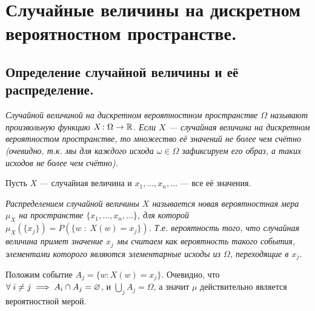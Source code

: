\section{Случайные величины на дискретном вероятностном пространстве.}

\subsection{Определение случайной величины и её распределение.}
\begin{definition}
    \it{Случайной величиной} на дискретном вероятностном пространстве $\Omega$ называют произвольную функцию
    $X \colon \Omega \to \mathbb{R}$. Если $X$ --- случайная величина на дискретном вероятностом пространстве, то
    множество её значений не более чем счётно (очевидно, т.к. мы для каждого исхода $\omega \in \Omega$
    зафиксируем его образ, а таких исходов не более чем счётно).
\end{definition}
Пусть $X$ --- случайная величина и $x_1, \ldots, x_n, \ldots$ --- все её значения.
\begin{definition}
    \it{Распределением} случайной величины $X$ называется новая вероятностная мера $\mu_{X}$ на пространстве
    $\{x_1, \ldots, x_n, \ldots\}$, для которой $\mu_X(\{x_j\}) = P(\{w\; \colon\; X(w) = x_j\})$. Т.е. вероятность
    того, что случайная величина примет значение $x_j$ мы считаем как вероятность такого события, элементами
    которого являются элементарные исходы из $\Omega$, переходящие в $x_j$.
\end{definition}
Положим событие $A_j = \{w \colon X(w) = x_j\}$. Очевидно, что $\forall\; i \neq j \implies A_i \cap A_j = \varnothing$,
и $\bigcup_{j} A_j = \Omega$, а значит $\mu$ действительно является вероятностной мерой.

